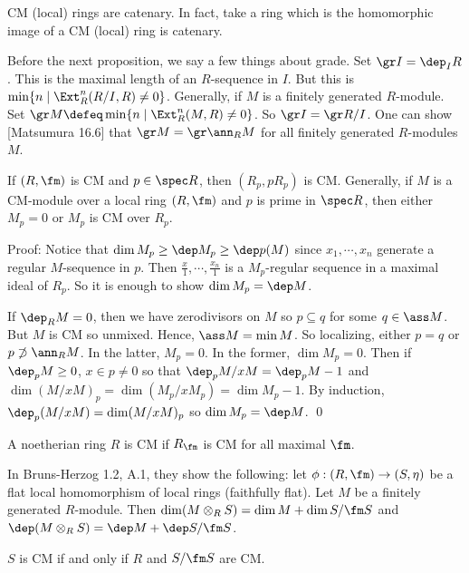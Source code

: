 \begin{cor}
CM (local) rings are catenary. In fact, take a ring which is the homomorphic image of a CM (local) ring is catenary. 
\end{cor}

Before the next proposition, we say a few things about grade. Set $\gr I=\dep_I R$. This is the maximal length of an $R$-sequence in $I$. But this is $\min\{n \;|\; \Ext_R^n(R/I,R)\neq 0\}$. Generally, if $M$ is a finitely generated $R$-module. Set $\gr M \defeq \min\{n \;|\; \Ext_R^n(M,R) \neq 0\}$. So $\gr I=\gr R/I$. One can show [Matsumura 16.6] that $\gr M=\gr \ann_R M$ for all finitely generated $R$-modules $M$. 

\begin{prop}[CM Localizes]
If $(R,\fm)$ is CM and $p \in \spec R$, then $(R_p,pR_p)$ is CM. Generally, if $M$ is a CM-module over a local ring $(R,\fm)$ and $p$ is prime in $\spec R$, then either $M_p=0$ or $M_p$ is CM over $R_p$. 
\end{prop}

\noindent Proof: Notice that $\dim M_p \geq \dep M_p \geq \dep p(M)$ since $x_1,\cdots,x_n$ generate a regular $M$-sequence in $p$. Then $\frac{x}{1},\cdots,\frac{x_n}{1}$ is a $M_p$-regular sequence in a maximal ideal of $R_p$. So it is enough to show $\dim M_p=\dep M$. 

If $\dep_R M=0$, then we have zerodivisors on $M$ so $p \subseteq q$ for some $q \in \ass M$. But $M$ is CM so unmixed. Hence, $\ass M=\min M$. So localizing, either $p=q$ or $p \not\supset \ann_R M$. In the latter, $M_p=0$. In the former, $\dim M_p=0$. Then if $\dep_p M \geq 0$, $x \in p \neq 0$ so that $\dep_p M/xM=\dep_p M-1$ and $\dim(M/xM)_p=\dim(M_p/xM_p)=\dim M_p-1$. By induction, $\dep_p(M/xM)=\dim(M/xM)_p$ so $\dim M_p=\dep M$. \qed \\

\begin{dfn}[CM]
A noetherian ring $R$ is CM if $R_\fm$ is CM for all maximal $\fm$. 
\end{dfn}

\begin{rem}
In Bruns-Herzog 1.2, A.1, they show the following: let $\phi: (R,\fm) \to (S,\eta)$ be a flat local homomorphism of local rings (faithfully flat). Let $M$ be a finitely generated $R$-module. Then $\dim(M \otimes_R S)=\dim M+\dim S/\fm S$ and $\dep(M \otimes_R S)=\dep M+\dep S/\fm S$. 
\end{rem}

\begin{cor}
$S$ is CM if and only if $R$ and $S/\fm S$ are CM.
\end{cor}

